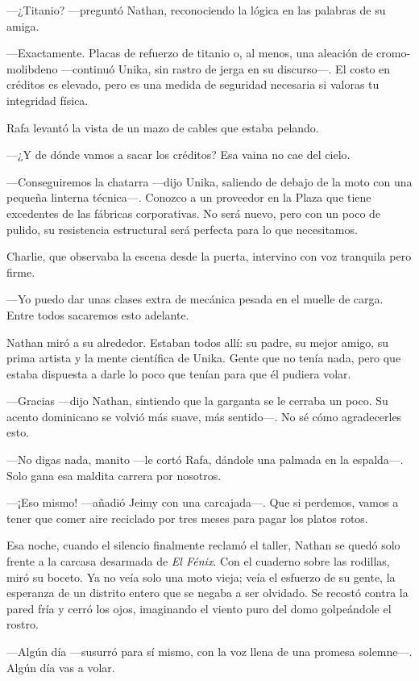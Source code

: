 \documentclass[12pt,a4paper]{book}
\begin{document}
 ---¿Titanio? ---preguntó Nathan, reconociendo la lógica en las palabras de su amiga.

 ---Exactamente. Placas de refuerzo de titanio o, al menos, una aleación de cromo-molibdeno ---continuó Unika, sin rastro de jerga en su discurso---. El costo en créditos es elevado, pero es una medida de seguridad necesaria si valoras tu integridad física.

Rafa levantó la vista de un mazo de cables que estaba pelando.

---¿Y de dónde vamos a sacar los créditos? Esa vaina no cae del cielo.

---Conseguiremos la chatarra ---dijo Unika, saliendo de debajo de la moto con una pequeña linterna técnica---. Conozco a un proveedor en la Plaza que tiene excedentes de las fábricas corporativas. No será nuevo, pero con un poco de pulido, su resistencia estructural será perfecta para lo que necesitamos.

Charlie, que observaba la escena desde la puerta, intervino con voz tranquila pero firme.

---Yo puedo dar unas clases extra de mecánica pesada en el muelle de carga. Entre todos sacaremos esto adelante.

Nathan miró a su alrededor. Estaban todos allí: su padre, su mejor amigo, su prima artista y la mente científica de Unika. Gente que no tenía nada, pero que estaba dispuesta a darle lo poco que tenían para que él pudiera volar.

---Gracias ---dijo Nathan, sintiendo que la garganta se le cerraba un poco. Su acento dominicano se volvió más suave, más sentido---. No sé cómo agradecerles esto.

---No digas nada, manito ---le cortó Rafa, dándole una palmada en la espalda---. Solo gana esa maldita carrera por nosotros.

---¡Eso mismo! ---añadió Jeimy con una carcajada---. Que si perdemos, vamos a tener que comer aire reciclado por tres meses para pagar los platos rotos.

Esa noche, cuando el silencio finalmente reclamó el taller, Nathan se quedó solo frente a la carcasa desarmada de \textit{El Fénix}. Con el cuaderno sobre las rodillas, miró su boceto. Ya no veía solo una moto vieja; veía el esfuerzo de su gente, la esperanza de un distrito entero que se negaba a ser olvidado. Se recostó contra la pared fría y cerró los ojos, imaginando el viento puro del domo golpeándole el rostro.

---Algún día ---susurró para sí mismo, con la voz llena de una promesa solemne---. Algún día vas a volar.
\end{document}
